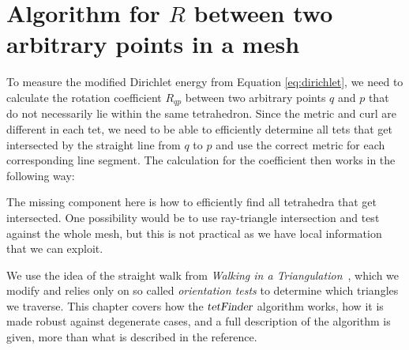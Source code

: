 \documentclass[../thesis.tex]{subfiles}
\begin{document}
\newcommand{\str}[1]{\textsc{#1}}
\newcommand{\var}[1]{\textit{#1}}


\chapter{Algorithm for $R$ between two arbitrary points in a mesh}
\label{ch:algorithm}
To measure the modified Dirichlet energy from Equation \ref{eq:dirichlet}, we need to calculate the rotation coefficient $R_{qp}$
between two arbitrary points $q$ and $p$ that do not necessarily lie within the same 
tetrahedron. Since the metric and curl are different in each tet, we need to be
able to efficiently determine all tets that get intersected by the straight
line from $q$ to $p$ and use the correct metric for each corresponding
line segment.
The calculation for the coefficient then works in the following way:

The missing component here is how to efficiently find all tetrahedra
that get intersected. One possibility would be to use ray-triangle intersection and
test against the whole mesh, but this is not practical as we have local information
that we can exploit.

We use the idea of the straight walk from \emph{Walking in a Triangulation}~\cite{Devillers}, which we modify and relies only on
so called \emph{orientation tests} to determine which triangles we traverse.
This chapter covers how the $\textsl{tetFinder}$ algorithm works, how it is made robust
against degenerate cases,
and a full description of the algorithm is given, more than what is described in the reference.
\end{document}
